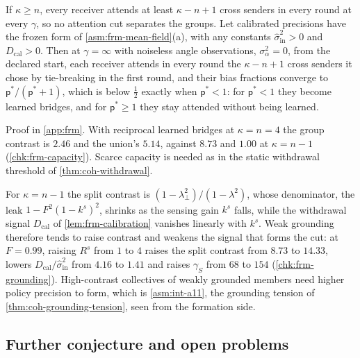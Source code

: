 \begin{proposition}\label{prop:frm-capacity}
If $\kappa\ge n$, every receiver attends at least $\kappa-n+1$ cross senders in every round at every $\gamma$, so no attention cut separates the groups. Let calibrated precisions have the frozen form of \cref{asm:frm-mean-field}(a), with any constants $\hat\sigma^2_{\mathrm{in}}>0$ and $D_{\mathrm{cal}}>0$. Then at $\gamma=\infty$ with noiseless angle observations, $\sigma_\alpha^2=0$, from the declared start, each receiver attends in every round the $\kappa-n+1$ cross senders it chose by tie-breaking in the first round, and their bias fractions converge to $\mathsf p^\ast/(\mathsf p^\ast+1)$, which is below $\frac12$ exactly when $\mathsf p^\ast<1$: for $\mathsf p^\ast<1$ they become learned bridges, and for $\mathsf p^\ast\ge1$ they stay attended without being learned.
\end{proposition}
Proof in \cref{app:frm}. With reciprocal learned bridges at $\kappa=n=4$ the group contrast is $2.46$ and the union's $5.14$, against $8.73$ and $1.00$ at $\kappa=n-1$ (\cref{chk:frm-capacity}). Scarce capacity is needed as in the static withdrawal threshold of \cref{thm:coh-withdrawal}.

\begin{remark}\label{rem:frm-grounding}
For $\kappa=n-1$ the split contrast is $(1-\lambda_\perp^2)/(1-\lambda^2)$, whose denominator, the leak $1-F^2(1-k^s)^2$, shrinks as the sensing gain $k^s$ falls, while the withdrawal signal $D_{\mathrm{cal}}$ of \cref{lem:frm-calibration} vanishes linearly with $k^s$. Weak grounding therefore tends to raise contrast and weakens the signal that forms the cut: at $F=0.99$, raising $R^s$ from $1$ to $4$ raises the split contrast from $8.73$ to $14.33$, lowers $D_{\mathrm{cal}}/\hat\sigma^2_{\mathrm{in}}$ from $4.16$ to $1.41$ and raises $\gamma_S$ from $68$ to $154$ (\cref{chk:frm-grounding}). High-contrast collectives of weakly grounded members need higher policy precision to form, which is \cref{asm:int-a11}, the grounding tension of \cref{thm:coh-grounding-tension}, seen from the formation side.
\end{remark}

\subsection{Further conjecture and open problems}\label{sup:frm-further-conjecture-and-open-problems}

